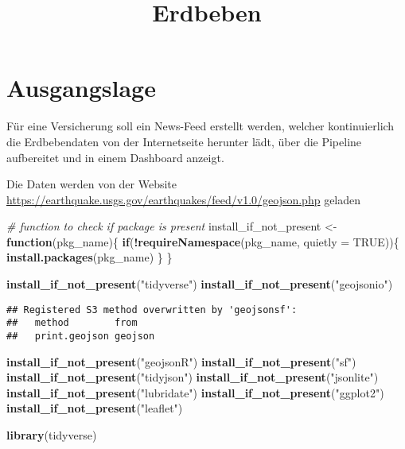 \documentclass[
]{article}
\title{Erdbeben}
\author{}
\date{\vspace{-2.5em}}
\newenvironment{Shaded}{\begin{snugshade}}{\end{snugshade}}
\newcommand{\AttributeTok}[1]{\textcolor[rgb]{0.13,0.29,0.53}{#1}}
\newcommand{\CommentTok}[1]{\textcolor[rgb]{0.56,0.35,0.01}{\textit{#1}}}
\newcommand{\ConstantTok}[1]{\textcolor[rgb]{0.56,0.35,0.01}{#1}}
\newcommand{\ControlFlowTok}[1]{\textcolor[rgb]{0.13,0.29,0.53}{\textbf{#1}}}
\newcommand{\FunctionTok}[1]{\textcolor[rgb]{0.13,0.29,0.53}{\textbf{#1}}}
\newcommand{\NormalTok}[1]{#1}
\newcommand{\OtherTok}[1]{\textcolor[rgb]{0.56,0.35,0.01}{#1}}
\newcommand{\SpecialCharTok}[1]{\textcolor[rgb]{0.81,0.36,0.00}{\textbf{#1}}}
\newcommand{\StringTok}[1]{\textcolor[rgb]{0.31,0.60,0.02}{#1}}
\begin{document}
\maketitle

\hypertarget{ausgangslage}{%
\section{Ausgangslage}\label{ausgangslage}}

Für eine Versicherung soll ein News-Feed erstellt werden, welcher
kontinuierlich die Erdbebendaten von der Internetseite herunter lädt,
über die Pipeline aufbereitet und in einem Dashboard anzeigt.

Die Daten werden von der Website
\url{https://earthquake.usgs.gov/earthquakes/feed/v1.0/geojson.php}
geladen

\begin{Shaded}
\begin{Highlighting}[]
\CommentTok{\# function to check if package is present}
\NormalTok{install\_if\_not\_present }\OtherTok{\textless{}{-}} \ControlFlowTok{function}\NormalTok{(pkg\_name)\{}
  \ControlFlowTok{if}\NormalTok{(}\SpecialCharTok{!}\FunctionTok{requireNamespace}\NormalTok{(pkg\_name, }\AttributeTok{quietly =} \ConstantTok{TRUE}\NormalTok{))\{}
    \FunctionTok{install.packages}\NormalTok{(pkg\_name)}
\NormalTok{  \}}
\NormalTok{\}}

\FunctionTok{install\_if\_not\_present}\NormalTok{(}\StringTok{"tidyverse"}\NormalTok{)}
\FunctionTok{install\_if\_not\_present}\NormalTok{(}\StringTok{"geojsonio"}\NormalTok{)}
\end{Highlighting}
\end{Shaded}

\begin{verbatim}
## Registered S3 method overwritten by 'geojsonsf':
##   method        from   
##   print.geojson geojson
\end{verbatim}

\begin{Shaded}
\begin{Highlighting}[]
\FunctionTok{install\_if\_not\_present}\NormalTok{(}\StringTok{"geojsonR"}\NormalTok{)}
\FunctionTok{install\_if\_not\_present}\NormalTok{(}\StringTok{"sf"}\NormalTok{)}
\FunctionTok{install\_if\_not\_present}\NormalTok{(}\StringTok{"tidyjson"}\NormalTok{)}
\FunctionTok{install\_if\_not\_present}\NormalTok{(}\StringTok{"jsonlite"}\NormalTok{)}
\FunctionTok{install\_if\_not\_present}\NormalTok{(}\StringTok{"lubridate"}\NormalTok{)}
\FunctionTok{install\_if\_not\_present}\NormalTok{(}\StringTok{"ggplot2"}\NormalTok{)}
\FunctionTok{install\_if\_not\_present}\NormalTok{(}\StringTok{"leaflet"}\NormalTok{)}

\FunctionTok{library}\NormalTok{(tidyverse)}
\end{Highlighting}
\end{Shaded}
\end{document}
